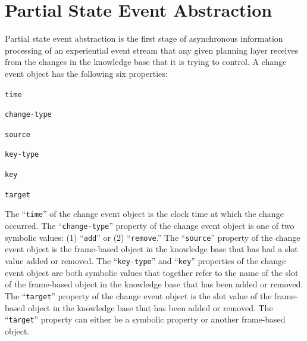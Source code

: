 \section{Partial State Event Abstraction}
\label{section:partial_state_event_abstraction}

Partial state event abstraction is the first stage of asynchronous
information processing of an experiential event stream that any given
planning layer receives from the changes in the knowledge base that it
is trying to control.  A change event object has the following six
properties:
\begin{packed_enumerate}
\item{{\tt{time}}}
\item{{\tt{change-type}}}
\item{{\tt{source}}}
\item{{\tt{key-type}}}
\item{{\tt{key}}}
\item{{\tt{target}}}
\end{packed_enumerate}
The ``{\tt{time}}'' of the change event object is the clock time at
which the change occurred.  The ``{\tt{change-type}}'' property of the
change event object is one of two symbolic values: (1) ``{\tt{add}}''
or (2) ``{\tt{remove}}.''  The ``{\tt{source}}'' property of the
change event object is the frame-based object in the knowledge base
that has had a slot value added or removed.  The ``{\tt{key-type}}''
and ``{\tt{key}}'' properties of the change event object are both
symbolic values that together refer to the name of the slot of the
frame-based object in the knowledge base that has been added or
removed.  The ``{\tt{target}}'' property of the change event object is
the slot value of the frame-based object in the knowledge base that
has been added or removed.  The ``{\tt{target}}'' property can either
be a symbolic property or another frame-based object.

